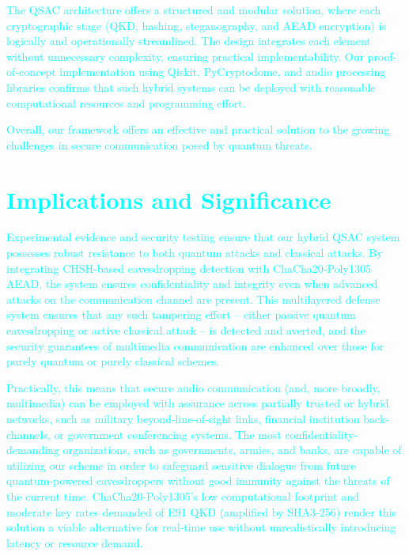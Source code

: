 \documentclass[a4paper]{cas-sc}
\begin{document}
\begin{itemize}
          \hspace{15pt}\textcolor{cyan}{The QSAC architecture offers a structured and modular solution, where each cryptographic stage (QKD, hashing, steganography, and AEAD encryption) is logically and operationally streamlined. The design integrates each element without unnecessary complexity, ensuring practical implementability. Our proof-of-concept implementation using Qiskit, PyCryptodome, and audio processing libraries confirms that such hybrid systems can be deployed with reasonable computational resources and programming effort.}
\end{itemize}

\textcolor{cyan}{Overall, our framework offers an effective and practical solution to the growing challenges in secure communication posed by quantum threats.}

\section{\textcolor{cyan}{Implications and Significance}}

\textcolor{cyan}{Experimental evidence and security testing ensure that our hybrid QSAC system possesses robust resistance to both quantum attacks and classical attacks. By integrating CHSH-based eavesdropping detection with ChaCha20‑Poly1305 AEAD, the system ensures confidentiality and integrity even when advanced attacks on the communication channel are present. This multilayered defense system ensures that any such tampering effort -- either passive quantum eavesdropping or active classical attack -- is detected and averted, and the security guarantees of multimedia communication are enhanced over those for purely quantum or purely classical schemes.}

\textcolor{cyan}{Practically, this means that secure audio communication (and, more broadly, multimedia) can be employed with assurance across partially trusted or hybrid networks, such as military beyond-line-of-sight links, financial institution back-channels, or government conferencing systems. The most confidentiality-demanding organizations, such as governments, armies, and banks, are capable of utilizing our scheme in order to safeguard sensitive dialogue from future quantum-powered eavesdroppers without good immunity against the threats of the current time. ChaCha20-Poly1305's low computational footprint and moderate key rates demanded of E91 QKD (amplified by SHA3-256) render this solution a viable alternative for real-time use without unrealistically introducing latency or resource demand.}
\end{document}
